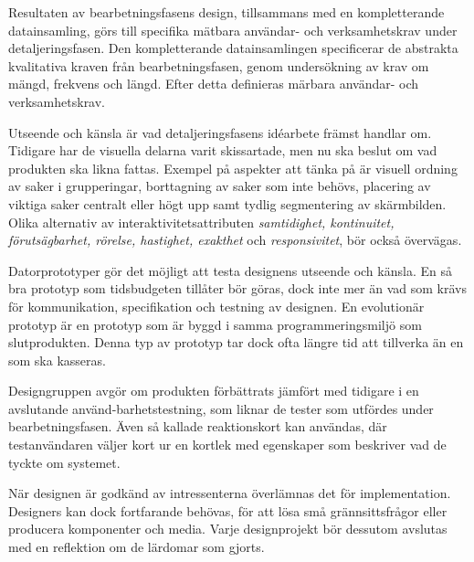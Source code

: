 \documentclass[a4paper,12pt,titlepage]{article}
\begin{document}
Resultaten av bearbetningsfasens design, tillsammans med en kompletterande datainsamling,
görs till specifika mätbara användar- och verksamhetskrav
under detaljeringsfasen. Den kompletterande datainsamlingen 
specificerar de abstrakta kvalitativa kraven från bearbetningsfasen, genom
undersökning av krav om mängd, frekvens och längd. Efter detta definieras
märbara användar- och verksamhetskrav.

Utseende och känsla är vad detaljeringsfasens idéarbete främst handlar om.
Tidigare har de visuella delarna varit skissartade, men nu ska beslut om vad
produkten ska likna fattas. Exempel på aspekter att tänka på är visuell ordning
av saker i grupperingar, borttagning av saker som inte behövs, placering av viktiga saker
centralt eller högt upp samt tydlig segmentering av skärmbilden. Olika
alternativ av interaktivitetsattributen \textit{samtidighet,
kontinuitet, förutsägbarhet, rörelse, hastighet, exakthet} och
\textit{responsivitet}, bör också övervägas.

Datorprototyper gör det möjligt att testa designens utseende och känsla. En så
bra prototyp som tidsbudgeten tillåter bör göras, dock inte mer än vad som
krävs för kommunikation, specifikation och testning av designen. En evolutionär
prototyp är en prototyp som är byggd i samma programmeringsmiljö som
slutprodukten. Denna typ av prototyp tar dock ofta längre tid att tillverka än
en som ska kasseras.

Designgruppen avgör om produkten förbättrats jämfört med tidigare i en
avslutande använd-barhetstestning, som liknar de tester som utfördes under
bearbetningsfasen. Även så kallade reaktionskort kan användas, där testanvändaren
väljer kort ur en kortlek med egenskaper som beskriver vad de tyckte om systemet.

När designen är godkänd av intressenterna överlämnas det för implementation. Designers
kan dock fortfarande behövas, för att lösa små grännsittsfrågor eller producera
komponenter och media. Varje designprojekt bör dessutom avslutas med en
reflektion om de lärdomar som gjorts.
\end{document}
